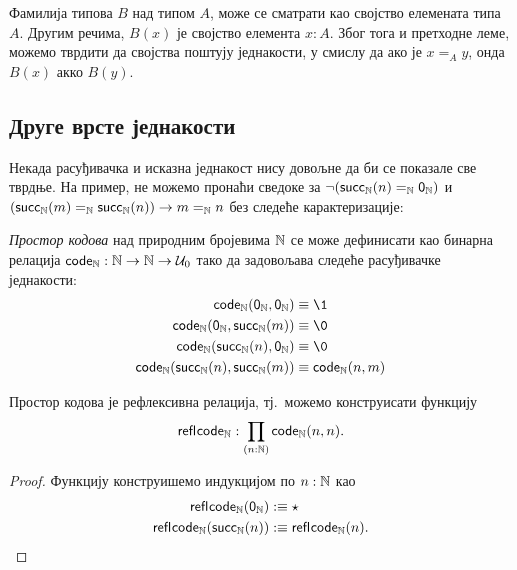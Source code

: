 \documentclass[12pt,oneside]{memoir}
\begin{document}
Фамилија типова $B$ над типом $A$, може се сматрати као својство елемената типа $A$. Другим речима, $B(x)$ је својство елемента $x : A$. Због тога и претходне леме, можемо тврдити да својства поштују једнакости, у смислу да ако је $x =_A y$, онда $B(x)$ акко $B(y)$.

\subsection{Друге врсте једнакости}

Некада расуђивачка и исказна једнакост нису довољне да би се показале све тврдње. На пример, не можемо пронаћи сведоке за $\neg (\mathsf{succ}_\mathbb{N}(n) =_{\mathbb{N}} \mathsf{0}_\mathbb{N})$ и $(\mathsf{succ}_\mathbb{N}(m) =_{\mathbb{N}} \mathsf{succ}_\mathbb{N}(n)) \to m =_{\mathbb{N}} n$ без следеће карактеризације:

\begin{definition}
    \label{def:code}
    \emph{Простор кодова} над природним бројевима ${\mathbb{N}}$ се може дефинисати као бинарна релација $\mathsf{code}_{{\mathbb{N}}} : {\mathbb{N}} \to {\mathbb{N}} \to \mathcal{U}_0$ тако да задовољава следеће расуђивачке једнакости:
    \begin{align*}
        \codee{\N} (\zeroN, \zeroN) &\equiv\1 \\
        \codee{\N} (\zeroN, \succN(m)) &\equiv\0 \\
        \codee{\N} (\succN(n), \zeroN) &\equiv\0 \\
        \codee{\N} (\succN(n), \succN(m)) &\equiv\codee{\N} (n, m) \\
    \end{align*}
\end{definition}

\begin{lemma}
    Простор кодова је рефлексивна релација, тј.~можемо конструисати функцију
    \[\mathsf{refl}_{}\mathsf{code}_{{\mathbb{N}}} : \prod_{(n : {\mathbb{N}})} \mathsf{code}_{{\mathbb{N}}} (n, n).\]
\end{lemma}
\begin{proof}
    Функцију конструишемо индукцијом по $n : {\mathbb{N}}$ као
    \begin{align*}
        \mathsf{refl}_{}\mathsf{code}_{{\mathbb{N}}} (\mathsf{0}_\mathbb{N}) &:\equiv \star \\
        \mathsf{refl}_{}\mathsf{code}_{{\mathbb{N}}} (\mathsf{succ}_\mathbb{N}(n)) &:\equiv \mathsf{refl}_{}\mathsf{code}_{{\mathbb{N}}} (n).
    \end{align*}
\end{proof}
\end{document}
